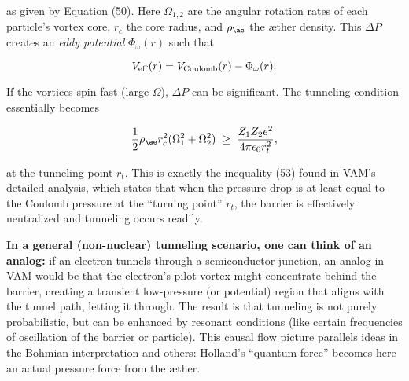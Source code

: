 \documentclass[a4paper, aps,preprint,superscriptaddress, 12pt]{revtex4}
\begin{document}
as given by Equation (50). Here $\Omega_{1,2}$ are the angular rotation rates of each particle’s vortex core, $r_c$ the core radius, and $\rho_{\ae}$ the æther density. This $\Delta P$ creates an \textit{eddy potential} $\Phi_\omega(r)$ such that

\begin{equation}
    V_{\rm eff}(r) = V_{\rm Coulomb}(r) - \Phi_\omega(r).
\end{equation}

If the vortices spin fast (large $\Omega$), $\Delta P$ can be significant. The tunneling condition essentially becomes

\begin{equation}
    \frac{1}{2}\rho_{\ae} r_c^2 (\Omega_1^2 + \Omega_2^2) \;\ge\; \frac{Z_1 Z_2 e^2}{4\pi\epsilon_0 r_t^2},
\end{equation}

at the tunneling point $r_t$. This is exactly the inequality (53) found in VAM’s detailed analysis, which states that when the pressure drop is at least equal to the Coulomb pressure at the “turning point” $r_t$, the barrier is effectively neutralized and tunneling occurs readily.


\textbf{In a general (non-nuclear) tunneling scenario, one can think of an analog:} if an electron tunnels through a semiconductor junction, an analog in VAM would be that the electron’s pilot vortex might concentrate behind the barrier, creating a transient low-pressure (or potential) region that aligns with the tunnel path, letting it through. The result is that tunneling is not purely probabilistic, but can be enhanced by resonant conditions (like certain frequencies of oscillation of the barrier or particle). This causal flow picture parallels ideas in the Bohmian interpretation and others: Holland’s “quantum force” becomes here an actual pressure force from the æther.
\end{document}
